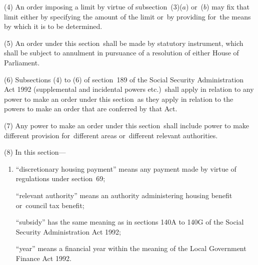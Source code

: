 \documentclass[12pt,a4paper]{article}
\begin{document}
(4) An order imposing a limit by virtue of subsection~(3)($a$)  or~($b$)  may fix that limit either by specifying the amount of the limit or~by providing for~the means by which it is to be determined.

(5) An order under this section~shall be made by statutory instrument, which shall be subject to annulment in pursuance of a resolution of either House of Parliament.

(6) Subsections (4)  to (6)  of section~189 of the Social Security Administration Act 1992 (supplemental and incidental powers etc.)\ shall apply in relation to any power to make an order under this section~as they apply in relation to the powers to make an order that are conferred by that Act.

(7) Any power to make an order under this section~shall include power to make different provision for~different areas or~different relevant authorities.

(8) In this section—
\begin{enumerate}\item[]
    “discretionary housing payment” means any payment made by virtue of regulations under section~69;

    “relevant authority” means an authority administering housing benefit or~council tax benefit;


    “subsidy” has the same meaning as in sections 140A to 140G of the Social Security Administration Act 1992;

    “year” means a financial year within the meaning of the Local Government Finance Act 1992.  
\end{enumerate}
\end{document}
